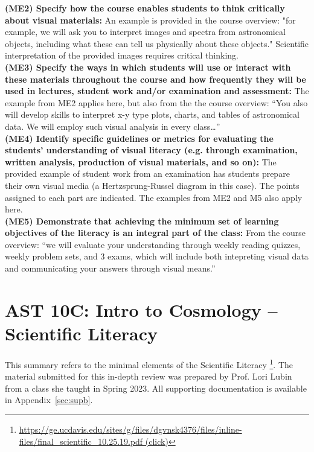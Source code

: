 \documentclass[12pt]{article}
\begin{document}
\noindent
{\bf (ME2) Specify how the course enables students to think critically about visual
  materials:} An example is provided in the course overview:  "for example, we will ask you to interpret images and spectra from astronomical objects, including what these can tell us physically about these objects."  Scientific interpretation of the provided images requires critical thinking.\\[1pt]

\noindent
{\bf (ME3) Specify the ways in which students will use or interact with these materials
throughout the course and how frequently they will be used in lectures, student
work and/or examination and assessment:} The example from ME2 applies here, but also from the the course overview:  ``You also will develop skills to interpret x-y type plots, charts, and tables of astronomical data.  We will employ such visual analysis in every class\ldots''\\[1pt]

\noindent
{\bf (ME4) Identify specific guidelines or metrics for evaluating the students’
understanding of visual literacy (e.g. through examination, written analysis,
production of visual materials, and so on):}
The provided example of student work from an examination has students prepare their own visual media (a Hertzsprung-Russel diagram in this case).  The points assigned to each
part are indicated.  The examples from ME2 and M5 also apply here.\\[1pt]

\noindent
{\bf (ME5) Demonstrate that achieving the minimum set of learning objectives of the
literacy is an integral part of the class:} From the course overview:  ``we will evaluate your understanding through weekly reading quizzes, weekly problem sets, and 3 exams, which will include both intepreting visual data and communicating your answers through visual means.''\\[1pt]

\newpage
\section{AST 10C: Intro to Cosmology -- Scientific Literacy}

This summary refers to the minimal elements of the Scientific Literacy \footnote{
\href{https://ge.ucdavis.edu/sites/g/files/dgvnsk4376/files/inline-files/final_scientific_10.25.19.pdf}{https://ge.ucdavis.edu/sites/g/files/dgvnsk4376/files/inline-files/final\_scientific\_10.25.19.pdf (click)}}.
The material submitted for this in-depth review was prepared by Prof. Lori Lubin
from a class she taught in Spring 2023.    All supporting documentation is available in Appendix~\ref{sec:supb}.\\
\end{document}
